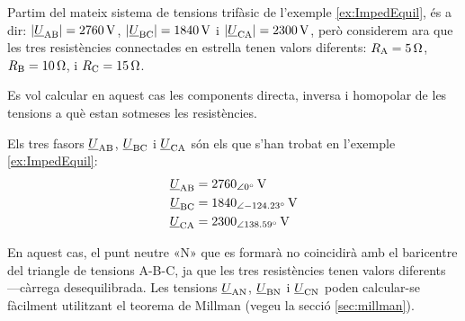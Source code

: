 \begin{exemple}\label{ex:ImpedDesequil}
	\addcontentsxms{\ImpedDesequil}
    Partim del mateix sistema de tensions trifàsic de l'exemple \vref{ex:ImpedEquil}, és a dir: $|\underline{U}_\mathrm{AB}| =  \qty{2760}{V}$, $|\underline{U}_\mathrm{BC}| = \qty{1840}{V}$ i
    $|\underline{U}_\mathrm{CA}| = \qty{2300}{V}$, però considerem ara que les tres resistències connectades en estrella tenen valors diferents:  $R_\mathrm{A}=\qty{5}{\ohm}$, $R_\mathrm{B}=\qty{10}{\ohm}$,  i $R_\mathrm{C}=\qty{15}{\ohm}$.

    \begin{center}
        
    \end{center}

    Es vol calcular en aquest cas  les components directa, inversa i homopolar de les tensions a què estan sotmeses les resistències.

    Els tres fasors $\underline{U}_\mathrm{AB} $, $\underline{U}_\mathrm{BC} $ i $\underline{U}_\mathrm{CA}$ són els que s'han trobat en l'exemple \ref{ex:ImpedEquil}:
    \begin{align*}
        \cmplx{U}\ped{AB} &= \qtypd{2760}{0}{V} \\
        \cmplx{U}\ped{BC} &= \qtypd{1840}{-124,23}{V} \\
        \cmplx{U}\ped{CA} &= \qtypd{2300}{138,59}{V}
    \end{align*}

    En aquest cas, el punt neutre «N» que es formarà no coincidirà amb el baricentre del triangle de tensions A-B-C, ja que les tres resistències tenen valors diferents ---càrrega  desequilibrada. Les tensions $\underline{U}_\mathrm{AN} $, $\underline{U}_\mathrm{BN} $ i $\underline{U}_\mathrm{CN}$ poden calcular-se fàcilment utilitzant el teorema de Millman (vegeu la secció \vref{sec:millman}).


\end{exemple}
